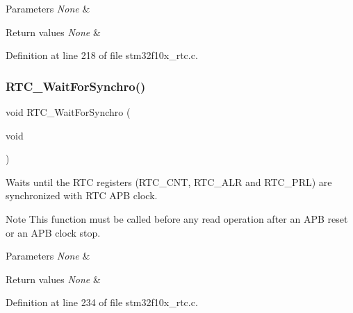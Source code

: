 \begin{DoxyParams}{Parameters}
{\em None} & \\
\hline
\end{DoxyParams}

\begin{DoxyRetVals}{Return values}
{\em None} & \\
\hline
\end{DoxyRetVals}


Definition at line 218 of file stm32f10x\+\_\+rtc.\+c.

\mbox{\label{group___r_t_c___private___functions_gaca4346e0dc15dccc15179786b28450db}} 
\subsubsection{\texorpdfstring{R\+T\+C\+\_\+\+Wait\+For\+Synchro()}{RTC\_WaitForSynchro()}}
{\footnotesize\ttfamily void R\+T\+C\+\_\+\+Wait\+For\+Synchro (\begin{DoxyParamCaption}\item[{void}]{ }\end{DoxyParamCaption})}



Waits until the R\+TC registers (R\+T\+C\+\_\+\+C\+NT, R\+T\+C\+\_\+\+A\+LR and R\+T\+C\+\_\+\+P\+RL) are synchronized with R\+TC A\+PB clock. 

\begin{DoxyNote}{Note}
This function must be called before any read operation after an A\+PB reset or an A\+PB clock stop. 
\end{DoxyNote}

\begin{DoxyParams}{Parameters}
{\em None} & \\
\hline
\end{DoxyParams}

\begin{DoxyRetVals}{Return values}
{\em None} & \\
\hline
\end{DoxyRetVals}


Definition at line 234 of file stm32f10x\+\_\+rtc.\+c.

